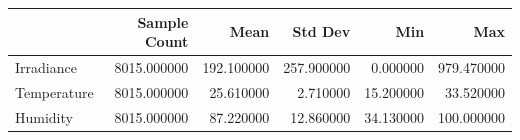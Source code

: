 \begin{tabular}{lrrrrr}
\toprule
 & Sample Count & Mean & Std Dev & Min & Max \\
\midrule
Irradiance & 8015.000000 & 192.100000 & 257.900000 & 0.000000 & 979.470000 \\
Temperature & 8015.000000 & 25.610000 & 2.710000 & 15.200000 & 33.520000 \\
Humidity & 8015.000000 & 87.220000 & 12.860000 & 34.130000 & 100.000000 \\
\bottomrule
\end{tabular}
